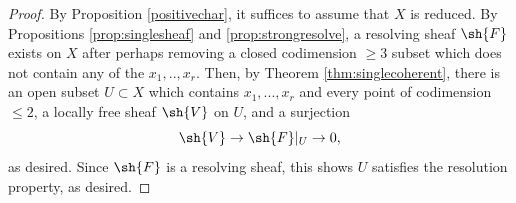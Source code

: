 \documentclass[12pt]{amsart}
\begin{document}
\begin{proof} By Proposition \ref{positivechar}, it suffices to assume that $X$ is reduced. By Propositions \ref{prop:singlesheaf} and \ref{prop:strongresolve}, a resolving sheaf $\sh{F}$ exists on $X$ after perhaps removing a closed codimension $\geq 3$ subset which does not contain any of the $x_1,..,x_r$. Then, by Theorem \ref{thm:singlecoherent}, there is an open subset $U \subset X$ which contains $x_1,...,x_r$ and every point of codimension $\leq 2$, a locally free sheaf $\sh{V}$ on $U$, and a surjection
\[\sh{V} \to \sh{F}|_U \to 0,\]
as desired. Since $\sh{F}$ is a resolving sheaf, this shows $U$ satisfies the resolution property, as desired. \end{proof} 





\end{document}
